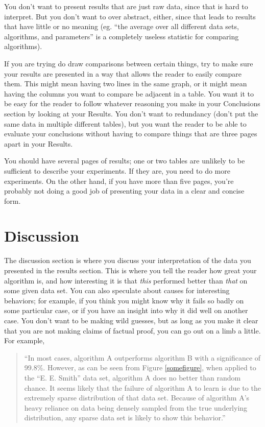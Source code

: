\documentclass[12pt, letterpaper]{article}
\begin{document}
You don't want to present results that are just raw data, since that is hard to
interpret.  But you don't want to over abstract, either, since that leads to
results that have little or no meaning (eg. ``the average over all different
data sets, algorithms, and parameters'' is a completely useless statistic for
comparing algorithms).

If you are trying do draw comparisons between certain things, try to make sure
your results are presented in a way that allows the reader to easily compare
them.  This might mean having two lines in the same graph, or it might mean
having the columns you want to compare be adjacent in a table.  You want it to
be easy for the reader to follow whatever reasoning you make in your Conclusions
section by looking at your Results.  You don't want to redundancy (don't put the
same data in multiple different tables), but you want the reader to be able to
evaluate your conclusions without having to compare things that are three pages
apart in your Results.

You should have several pages of results; one or two tables are unlikely to be
sufficient to describe your experiments.  If they are, you need to do more
experiments.  On the other hand, if you have more than five pages, you're
probably not doing a good job of presenting your data in a clear and concise
form.

\section{Discussion}
The discussion section is where you discuss your interpretation of the data you
presented in the results section.  This is where you tell the reader how great
your algorithm is, and how interesting it is that \emph{this} performed better
than \emph{that} on some given data set.  You can also speculate about causes
for interesting behaviors; for example, if you think you might know why it fails
so badly on some particular case, or if you have an insight into why it did well
on another case.  You don't want to be making wild guesses, but as long as you
make it clear that you are not making claims of factual proof, you can go out on
a limb a little.  For example,

\begin{quote}
``In most cases, algorithm A outperforms algorithm B with a significance of
99.8\%.  However, as can be seen from Figure \ref{somefigure}, when applied to
the ``E. E. Smith'' data set, algorithm A does no better than random chance.  It
seems likely that the failure of algorithm A to learn is due to the extremely
sparse distribution of that data set.  Because of algorithm A's heavy reliance
on data being densely sampled from the true underlying distribution, any sparse
data set is likely to show this behavior.''
\end{quote}
\end{document}
